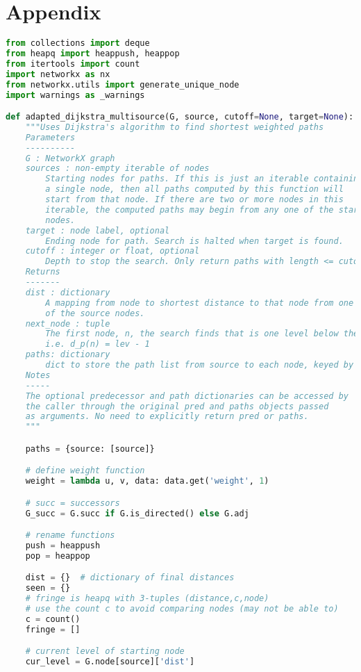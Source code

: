 \section{Appendix}
\begin{lstlisting}[language=Python]
from collections import deque
from heapq import heappush, heappop
from itertools import count
import networkx as nx
from networkx.utils import generate_unique_node
import warnings as _warnings

def adapted_dijkstra_multisource(G, source, cutoff=None, target=None):
    """Uses Dijkstra's algorithm to find shortest weighted paths
    Parameters
    ----------
    G : NetworkX graph
    sources : non-empty iterable of nodes
        Starting nodes for paths. If this is just an iterable containing
        a single node, then all paths computed by this function will
        start from that node. If there are two or more nodes in this
        iterable, the computed paths may begin from any one of the start
        nodes.
    target : node label, optional
        Ending node for path. Search is halted when target is found.
    cutoff : integer or float, optional
        Depth to stop the search. Only return paths with length <= cutoff.
    Returns
    -------
    dist : dictionary
        A mapping from node to shortest distance to that node from one
        of the source nodes.
    next_node : tuple
        The first node, n, the search finds that is one level below the current node
        i.e. d_p(n) = lev - 1
    paths: dictionary
        dict to store the path list from source to each node, keyed by node.
    Notes
    -----
    The optional predecessor and path dictionaries can be accessed by
    the caller through the original pred and paths objects passed
    as arguments. No need to explicitly return pred or paths.
    """

    paths = {source: [source]}

    # define weight function
    weight = lambda u, v, data: data.get('weight', 1)

    # succ = successors
    G_succ = G.succ if G.is_directed() else G.adj

    # rename functions
    push = heappush
    pop = heappop

    dist = {}  # dictionary of final distances
    seen = {}
    # fringe is heapq with 3-tuples (distance,c,node)
    # use the count c to avoid comparing nodes (may not be able to)
    c = count()
    fringe = []

    # current level of starting node
    cur_level = G.node[source]['dist']


\end{lstlisting}
